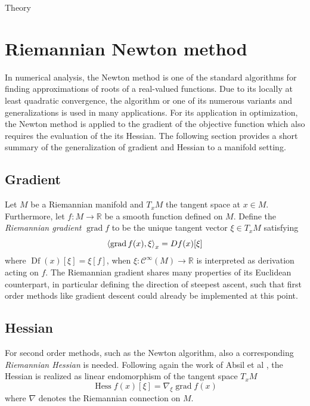 \begin{chapter}{Theory}
\section{Riemannian Newton method} %
\label{sec:Riemannian Newton method}
In numerical analysis, the Newton method is one of the standard algorithms for finding approximations of roots of a real-valued functions. Due to its locally at least quadratic
convergence, the algorithm or one of its numerous variants and generalizations is used in many applications. For its application in optimization, the Newton method is applied to the gradient of the objective function which also requires the evaluation of the its Hessian.
The following section provides a short summary of the generalization of gradient and Hessian to a manifold setting.

\subsection{Gradient} %
\label{sub:Gradient}
Let $M$ be a Riemannian manifold and $T_xM$ the tangent space at $x\in M$. Furthermore, let $f: M\to\mathbb{R}$ be a smooth function defined on $M$.
Define the \emph{Riemannian gradient} $\operatorname{grad} f$ to be the unique tangent vector $\xi\in T_xM$ satisfying 
\begin{equation}
    \label{eq:gradient}
    \left\langle \operatorname{grad}f(x),\xi \right\rangle_x=\mathop{Df}(x)[\xi]
\end{equation}
where $\mathop{Df}(x)[\xi] = \xi[f]$, when $\xi:\mathcal{C}^{\infty}(M)\to\mathbb{R}$ is interpreted as derivation acting on $f$. The Riemannian gradient
shares many properties of its Euclidean counterpart, in particular defining the direction of steepest ascent, such that first order methods like
gradient descent could already be implemented at this point.\\

\subsection{Hessian} %
\label{sub:Hessian}
For second order methods, such as the Newton algorithm, also a corresponding \emph{Riemannian Hessian} is needed. Following again the work 
of Absil et al \cite{Absil2009}, the Hessian is realized as linear endomorphism of the tangent space $T_xM$
\begin{equation}
    \label{eq:hessian}
    \operatorname{Hess}f(x)[\xi]=\nabla_{\xi}\operatorname{grad}f(x)
\end{equation}
where $\nabla$ denotes the Riemannian connection on $M$.\\


\end{chapter}
